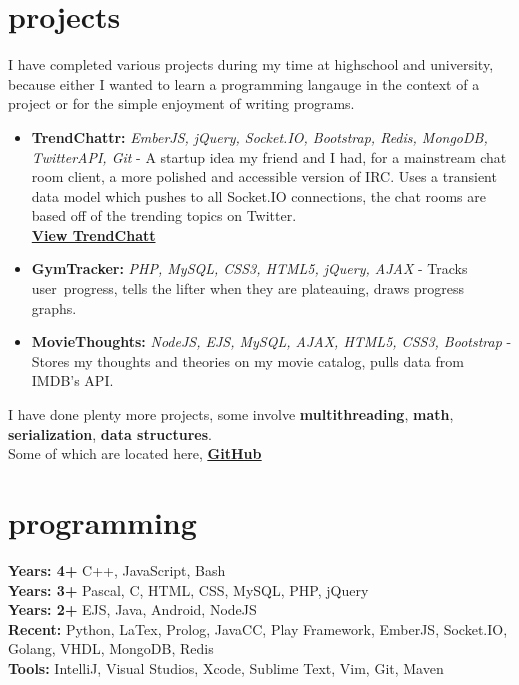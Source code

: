 \documentclass[]{friggeri-cv} %
\begin{document}
\section{projects}
I have completed various projects during my time at highschool and university, because either I wanted to learn a programming langauge
in the context of a project or for the simple enjoyment of writing programs.
\begin{itemize}
    \item \textbf{TrendChattr:} \emph{EmberJS, jQuery, Socket.IO, Bootstrap, Redis, MongoDB, TwitterAPI, Git} -
        A startup idea my friend and I had, for a mainstream chat room client, a more polished and accessible version of IRC. Uses a transient data model which pushes
        to all Socket.IO connections, the chat rooms are based off of the trending topics on Twitter. \\
        {\footnotesize \textbf{\href{http://chat.trendchattr.com/\#/rooms}{View TrendChatt}}}

    \item \textbf{GymTracker:} \emph{PHP, MySQL, CSS3, HTML5, jQuery, AJAX} -
        Tracks user progress, tells the lifter when they are plateauing, draws progress graphs.

    \item \textbf{MovieThoughts:} \emph{NodeJS, EJS, MySQL, AJAX, HTML5, CSS3, Bootstrap} -
        Stores my thoughts and theories on my movie catalog, pulls data from IMDB's API.
\end{itemize}
I have done plenty more projects, some involve \textbf{multithreading}, \textbf{math}, \textbf{serialization}, \textbf{data structures}. \\
Some of which are located here, \underline{\textbf{\href{http://github.com/Compulsed/}{GitHub}}}




\section{programming}
    \textbf{Years: 4+} C++, JavaScript, Bash \\
    \textbf{Years: 3+} Pascal, C, HTML, CSS, MySQL, PHP, jQuery \\
    \textbf{Years: 2+} EJS, Java, Android, NodeJS \\
    \textbf{Recent:}  Python, LaTex, Prolog, JavaCC, Play Framework, EmberJS, Socket.IO, Golang, VHDL, MongoDB, Redis\\
    \textbf{Tools:} IntelliJ, Visual Studios, Xcode, Sublime Text, Vim, Git, Maven
\end{document}
